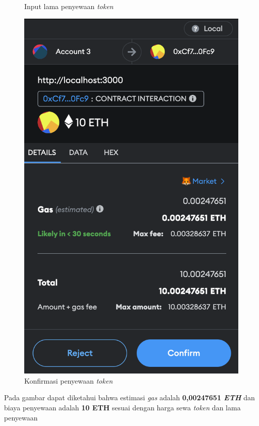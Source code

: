 \begin{itemize}
\begin{figure} [H]
            \caption{Input lama penyewaan \emph{token}}
            \label{fig:TestShareInputRentalPeriodToken}
        \end{figure}
        \begin{figure} [H] \centering
            \includegraphics[scale=0.4]{gambar/img-test-share-rent-2.png}
            \caption{Konfirmasi penyewaan \emph{token}}
            \label{fig:TestShareKonfirmasiPenyewaanToken}
        \end{figure}
        Pada gambar dapat diketahui bahwa estimasi \emph{gas} adalah \textbf{0,00247651 \emph{ETH}} dan biaya penyewaan adalah \textbf{10 ETH} sesuai dengan harga sewa \emph{token} dan lama penyewaan

\end{itemize}
